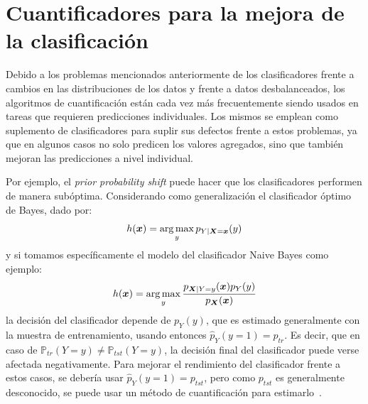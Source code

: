 \section{Cuantificadores para la mejora de la
clasificación}\label{problema:mejora}

Debido a los problemas mencionados anteriormente de los clasificadores frente a
cambios en las distribuciones de los datos y frente a datos desbalanceados, los
algoritmos de cuantificación están cada vez más frecuentemente siendo usados en
tareas que requieren predicciones individuales. Los mismos se emplean como
suplemento de clasificadores para suplir sus defectos frente a estos problemas,
ya que en algunos casos no solo predicen los valores agregados, sino que también
mejoran las predicciones a nivel individual.

Por ejemplo, el {\it prior probability shift\/} puede hacer que los
clasificadores performen de manera subóptima. Considerando como generalización
el clasificador óptimo de Bayes, dado por:
\begin{equation}\label{ecuacion:bayes_optimo}
    h(\boldsymbol{x}) = \operatorname*{arg\,max}_{y} p_{Y|\boldsymbol{X}=\boldsymbol{x}}(y)
\end{equation}
y si tomamos específicamente el modelo del clasificador Naive Bayes como
ejemplo:
\begin{equation}\label{ecuacion:bayes_naive}
    h(\boldsymbol{x}) = \operatorname*{arg\,max}_{y} \frac{p_{\boldsymbol{X}|Y=y}(\boldsymbol{x})p_Y(y)}{p_{\boldsymbol{X}}(\boldsymbol{x})}
\end{equation}
la decisión del clasificador depende de $p_Y(y)$, que es estimado generalmente
con la muestra de entrenamiento, usando entonces $\hat p_Y(y=1) = p_{tr}$. Es
decir, que en caso de $\mathbb{P}_{tr}(Y=y) \neq \mathbb{P}_{tst}(Y=y)$, la
decisión final del clasificador puede verse afectada negativamente. Para mejorar
el rendimiento del clasificador frente a estos casos, se debería usar $\hat
p_Y(y=1) = p_{tst}$, pero como $p_{tst}$ es generalmente desconocido, se puede
usar un método de cuantificación para estimarlo~\cite{saerens2002adjusting,
alaiz2011class, zhang2010transfer, xue2009quantification}.

